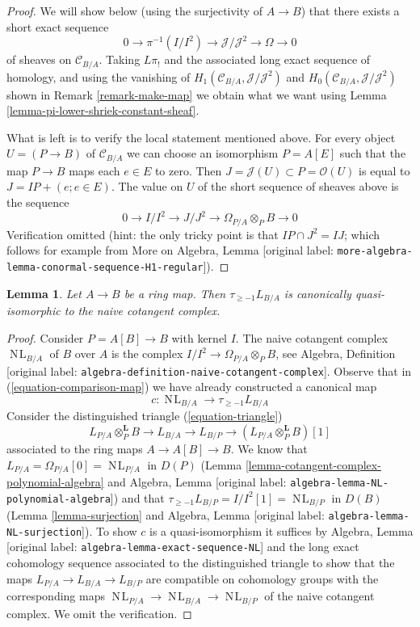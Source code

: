 \documentclass[10pt,a4paper]{article}
\theoremstyle{plain}
\newtheorem{lemma}[subsection]{Lemma}
\theoremstyle{definition}
\theoremstyle{remark}
\numberwithin{equation}{subsection}
\def\NL{\mathop{N\!L}\nolimits}
\begin{document}
\begin{proof}
We will show below (using the surjectivity of $A \to B$)
that there exists a short exact sequence
$$
0 \to \pi^{-1}(I/I^2) \to \mathcal{J}/\mathcal{J}^2 \to \Omega \to 0
$$
of sheaves on $\mathcal{C}_{B/A}$. Taking $L\pi_!$ and
the associated long exact sequence of homology, and using the
vanishing of $H_1(\mathcal{C}_{B/A}, \mathcal{J}/\mathcal{J}^2)$ and
$H_0(\mathcal{C}_{B/A}, \mathcal{J}/\mathcal{J}^2)$
shown in Remark \ref{remark-make-map} we obtain what we want using
Lemma \ref{lemma-pi-lower-shriek-constant-sheaf}.

\medskip\noindent
What is left is to verify the local statement mentioned above.
For every object $U = (P \to B)$ of $\mathcal{C}_{B/A}$
we can choose an isomorphism $P = A[E]$ such that the map
$P \to B$ maps each $e \in E$ to zero. Then
$J = \mathcal{J}(U) \subset P = \mathcal{O}(U)$
is equal to $J = IP + (e; e \in E)$. The value on $U$ of the short sequence
of sheaves above is the sequence
$$
0 \to I/I^2 \to J/J^2 \to \Omega_{P/A} \otimes_P B \to 0
$$
Verification omitted (hint: the only tricky point is that
$IP \cap J^2 = IJ$; which follows for example from
More on Algebra, Lemma \textnormal{[original label: \nolinkurl{more-algebra-lemma-conormal-sequence-H1-regular}]}).
\end{proof}

\begin{lemma}
\label{lemma-relation-with-naive-cotangent-complex}
Let $A \to B$ be a ring map. Then $\tau_{\geq -1}L_{B/A}$
is canonically quasi-isomorphic to the naive cotangent complex.
\end{lemma}

\begin{proof}
Consider $P = A[B] \to B$ with kernel $I$. The naive cotangent
complex $\NL_{B/A}$ of $B$ over $A$ is the complex
$I/I^2 \to \Omega_{P/A} \otimes_P B$,
see Algebra, Definition \textnormal{[original label: \nolinkurl{algebra-definition-naive-cotangent-complex}]}.
Observe that in (\ref{equation-comparison-map}) we have already
constructed a canonical map
$$
c : \NL_{B/A} \longrightarrow \tau_{\geq -1}L_{B/A}
$$
Consider the distinguished triangle (\ref{equation-triangle})
$$
L_{P/A} \otimes_P^\mathbf{L} B \to L_{B/A} \to L_{B/P} \to 
(L_{P/A} \otimes_P^\mathbf{L} B)[1]
$$
associated to the ring maps $A \to A[B] \to B$. We know that
$L_{P/A} = \Omega_{P/A}[0] = \NL_{P/A}$ in $D(P)$
(Lemma \ref{lemma-cotangent-complex-polynomial-algebra}
and
Algebra, Lemma \textnormal{[original label: \nolinkurl{algebra-lemma-NL-polynomial-algebra}]})
and that
$\tau_{\geq -1}L_{B/P} = I/I^2[1] = \NL_{B/P}$ in $D(B)$
(Lemma \ref{lemma-surjection} and
Algebra, Lemma \textnormal{[original label: \nolinkurl{algebra-lemma-NL-surjection}]}).
To show $c$ is a quasi-isomorphism it suffices by
Algebra, Lemma \textnormal{[original label: \nolinkurl{algebra-lemma-exact-sequence-NL}]}
and the long exact cohomology sequence associated to the
distinguished triangle
to show that the maps $L_{P/A} \to L_{B/A} \to L_{B/P}$ are compatible
on cohomology groups with the corresponding maps
$\NL_{P/A} \to \NL_{B/A} \to \NL_{B/P}$
of the naive cotangent complex. We omit the verification.
\end{proof}
\end{document}
